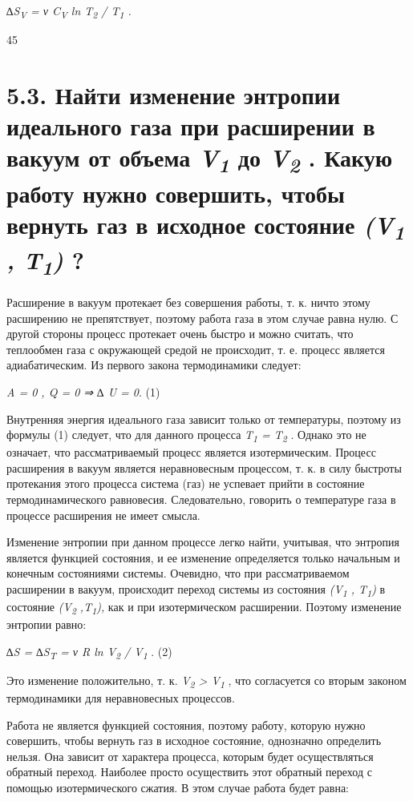 \emph{∆S\textsubscript{V} = ν C\textsubscript{V} ln T\textsubscript{2} /
T\textsubscript{1} .}

45

\section{5.3. Найти изменение энтропии идеального газа при расширении в
вакуум от объема \emph{V\textsubscript{1}} до \emph{V\textsubscript{2}}
. Какую работу нужно совершить, чтобы вернуть газ в исходное состояние
\emph{(V\textsubscript{1} , T\textsubscript{1})} ?} \label{entropyOfVacuum}

\solving{}

Расширение в вакуум протекает без совершения работы, т. к. ничто этому
расширению не препятствует, поэтому работа газа в этом случае равна
нулю. С другой стороны процесс протекает очень быстро и можно считать,
что теплообмен газа с окружающей средой не происходит, т. е. процесс
является адиабатическим. Из первого закона термодинамики следует:

\emph{A = 0 , Q = 0 ⇒ ∆ U = 0}. (1)

Внутренняя энергия идеального газа зависит только от температуры,
поэтому из формулы (1) следует, что для данного процесса
\emph{T\textsubscript{1} = T\textsubscript{2}} . Однако это не означает,
что рассматриваемый процесс является изотермическим. Процесс расширения
в вакуум является неравновесным процессом, т. к. в силу быстроты
протекания этого процесса система (газ) не успевает прийти в состояние
термодинамического равновесия. Следовательно, говорить о температуре
газа в процессе расширения не имеет смысла.

Изменение энтропии при данном процессе легко найти, учитывая, что
энтропия является функцией состояния, и ее изменение определяется только
начальным и конечным состояниями системы. Очевидно, что при
рассматриваемом расширении в вакуум, происходит переход системы из
состояния \emph{(V\textsubscript{1} , T\textsubscript{1})} в состояние
\emph{(V\textsubscript{2} ,T\textsubscript{1}),} как и при
изотермическом расширении. Поэтому изменение энтропии равно:

\emph{∆S = ∆S\textsubscript{T} = ν R ln V\textsubscript{2} /
V\textsubscript{1}} . (2)

Это изменение положительно, т. к. \emph{V\textsubscript{2}
\textgreater{} V\textsubscript{1}} , что согласуется со вторым законом
термодинамики для неравновесных процессов.

Работа не является функцией состояния, поэтому работу, которую нужно
совершить, чтобы вернуть газ в исходное состояние, однозначно определить
нельзя. Она зависит от характера процесса, которым будет осуществляться
обратный переход. Наиболее просто осуществить этот обратный переход с
помощью изотермического сжатия. В этом случае работа будет равна:

